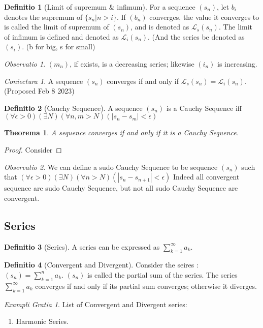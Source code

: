 \documentclass[12pt, a4paper]{report}
\newtheorem{theorem}{Theorema}[section]
\theoremstyle{definition}
\newtheorem{definition}{Definitio}[section]
\theoremstyle{definition}
\theoremstyle{remark}
\newtheorem{remark}{Observatio}[section]
\newtheorem{hypothesis}{Coniectura}[section]
\newtheorem{example}{Exampli Gratia}[section]
\begin{document}
\begin{definition}[Limit of supremum \& infimum]\label{def:limiSupremum}
	For a sequence $(s_n)$, let $b_i$ denotes the supremum of $\{s_n|n>i\}$.
	If $(b_n)$ converges, the value it converges to is called the limit of supremum of $(s_n)$, and is denoted as $\mathcal{L}_s (s_n)$. 
	The limit of infimum is defined and denoted as $\mathcal{L}_i(s_n)$. (And the series be denoted as $(s_i)$.
	(b for big, s for small)
\end{definition}
\begin{remark}
	$(m_n)$, if exists, is a decreasing series; likewise $(i_n)$ is increasing.
\end{remark}
\begin{hypothesis} 
	A sequence $(s_n)$ converges if and only if $\mathcal{L}_s (s_n) = \mathcal{L}_i(s_n)$. 
	(Proposed Feb 8 2023)
\end{hypothesis}
\begin{definition}[Cauchy Sequence]\cite{Ross}
	A sequence $(s_n)$ is a Cauchy Sequence iff $(\forall \epsilon > 0)(\exists N)(\forall n,m>N)(|s_n-s_m|<\epsilon)$
\end{definition}
\begin{theorem}
A sequence converges if and only if it is a Cauchy Sequence.
\end{theorem}
\begin{proof}
Consider 
\end{proof}
\begin{remark}
	We can define a sudo Cauchy Sequence to be sequence $(s_n)$ such that $(\forall \epsilon > 0)(\exists N)(\forall n>N)(|s_n-s_{n+1}|<\epsilon)$ Indeed all convergent sequence are sudo Cauchy Sequence, but not all sudo Cauchy Sequence are convergent.
\end{remark}

\subsection{Series}
\begin{definition}[Series]
	A series can be expressed as $ \sum^{\infty}_{k=1} a_k$. 
\end{definition}
\begin{definition}[Convergent and Divergent]
	Consider the seires :\\
	$(s_n)=\sum^{n}_{k=1} a_k$. $(s_n)$ is called the partial sum of the series. The series $\sum^{\infty}_{k=1}a_k $ converges if and only if its partial sum converges; otherwise it diverges. 
\end{definition}
\begin{example}
List of Convergent and Divergent series:
\begin{enumerate}
	\item Harmonic Series.
\end{enumerate}
\end{example}
\end{document}
